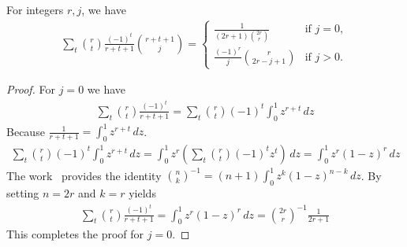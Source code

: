 \begin{lemma}
    \label{lem:piecewise-binomial-identity}
    For integers $r, j$, we have
    \begin{align*}
        \sum_{t} \binom{r}{t} \frac{(-1)^t}{r+t+1} \binom{r+t+1}{j}
        = \begin{cases}
              \displaystyle \frac{1}{(2r+1) \binom{2r}{r}} & \text{if } j=0, \\[0.8em]
              \displaystyle \frac{(-1)^r}{j} \binom{r}{2r-j+1} & \text{if } j>0.
        \end{cases}
    \end{align*}
    \begin{proof}
        For $j=0$ we have
        \begin{align*}
            \sum_t \binom{r}{t} \frac{(-1)^t}{r+t+1} = \sum_t \binom{r}{t} (-1)^t \int_0^1 z^{r+t} \, dz
        \end{align*}
        Because $\frac{1}{r+t+1} = \int_0^1 z^{r+t} \, dz$.
        \begin{align*}
            \sum_t \binom{r}{t} (-1)^t \int_0^1 z^{r+t} \, dz
            = \int_0^1 z^r \left( \sum_t \binom{r}{t} (-1)^t z^{t} \right) \, dz
            = \int_0^1 z^r (1 - z)^r \, dz
        \end{align*}
        The work~\cite{sury2004identities} provides the identity $\binom{n}{k}^{-1}=(n+1)\int_0^1 z^k(1-z)^{n-k}\,dz$.
        By setting $n=2r$ and $k=r$ yields
        \begin{align*}
            \sum_t \binom{r}{t} \frac{(-1)^t}{r+t+1} = \int_0^1 z^r (1-z)^{r}\,dz = \binom{2r}{r}^{-1} \frac{1}{2r+1}
        \end{align*}
        This completes the proof for $j=0$.


\end{proof}
\end{lemma}
